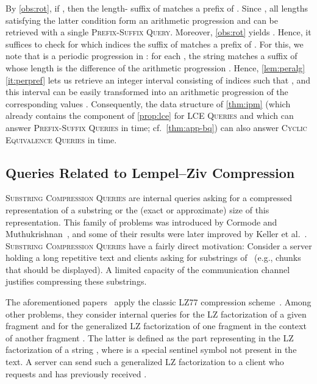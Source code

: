 \documentclass[a4paper]{article}
\theoremstyle{definition}
\theoremstyle{remark}
\newcommand{\BQ}{\textsc{Prefix-Suffix Queries}\xspace}
\newcommand{\FC}{\textsc{Cyclic Equivalence Queries}\xspace}
\newcommand{\LCEQ}{\textsc{LCE Queries}\xspace}
\begin{document}
By \cref{obs:rot}, if ,
then the length- suffix of  matches a prefix of .
Since , all lengths  satisfying the latter condition form an arithmetic progression and can be retrieved with a single 
\textsc{Prefix-Suffix Query}. 
Moreover, \cref{obs:rot} yields .
Hence, it suffices to check for which indices  the suffix  of  matches a prefix of .
For this, we note that  is a periodic progression in :
for each , the string  matches a suffix of 
whose length is the difference of the arithmetic progression .
Hence, \cref{lem:peralg}\ref{it:perpref} lets us retrieve an integer interval
consisting of indices  such that , and this interval can be easily
transformed into an arithmetic progression of the corresponding values .
Consequently, the data structure of \cref{thm:ipm} (which already contains the component of \cref{prop:lce} for \LCEQ and which can answer \BQ in  time; cf.\ \cref{thm:app-bq})
can also answer \FC in  time.
 
\thmfc*

\subsection{Queries Related to Lempel--Ziv Compression}\label{sec:GSC}
\textsc{Substring Compression Queries} are internal queries asking for a compressed representation of a substring or the (exact or approximate) size of this representation.
This family of problems was introduced by Cormode and Muthukrishnan~\cite{DBLP:conf/soda/CormodeM05},
and some of their results were later improved by Keller et al.~\cite{DBLP:journals/tcs/KellerKFL14}.
\textsc{Substring Compression Queries} have a fairly direct motivation: 
Consider a server holding a long repetitive text  and clients asking for substrings of~ (e.g., chunks that should be displayed).
A limited capacity of the communication channel justifies compressing these substrings.

The aforementioned papers~\cite{DBLP:conf/soda/CormodeM05,DBLP:journals/tcs/KellerKFL14} apply the classic LZ77 compression scheme~\cite{DBLP:journals/tit/ZivL77}.
Among other problems, they consider internal queries for the LZ factorization of a given fragment 
and for the generalized LZ factorization of one fragment  in the context of another fragment .
The latter is defined as the part representing  in the LZ factorization of a string , 
where  is a special sentinel symbol not present in the text. 
A server can send such a generalized LZ factorization to a client who requests  and has previously received .
\end{document}
